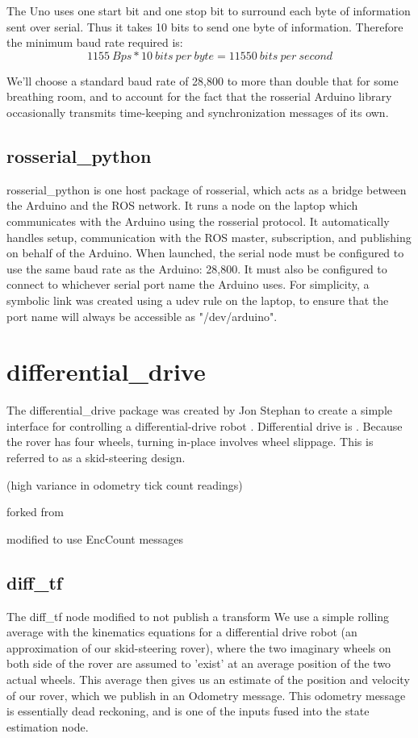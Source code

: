 The Uno uses one start bit and one stop bit to surround each byte of information sent over serial. Thus it takes 10 bits to send one byte of information. Therefore the minimum baud rate required is:
\[1155\ Bps * 10\ bits\ per\ byte = 11550\ bits\ per\ second\]

We'll choose a standard baud rate of 28,800 to more than double that for some breathing room, and to account for the fact that the rosserial Arduino library occasionally transmits time-keeping and synchronization messages of its own.

\subsection{rosserial\_python}
rosserial\_python is one host package of rosserial, which acts as a bridge between the Arduino and the ROS network. It runs a node on the laptop which communicates with the Arduino using the rosserial protocol. It automatically handles setup, communication with the ROS master, subscription, and publishing on behalf of the Arduino. When launched, the serial node must be configured to use the same baud rate as the Arduino: 28,800. It must also be configured to connect to whichever serial port name the Arduino uses. For simplicity, a symbolic link was created using a udev rule on the laptop, to ensure that the port name will always be accessible as "/dev/arduino". %

\section{differential\_drive}
The differential\_drive package was created by Jon Stephan to create a simple interface for controlling a differential-drive robot \cite{}. Differential drive is . Because the rover has four wheels, turning in-place involves wheel slippage. This is referred to as a skid-steering design. 

(high variance in odometry tick count readings)

forked from %

modified to use EncCount messages

\subsection{diff\_tf}
The diff\_tf node 
modified to not publish a transform
We use a simple
rolling average with the kinematics equations for a differential drive
robot (an approximation of our skid-steering rover), where the two imaginary
wheels on both side of the rover are assumed to 'exist' at an average position
of the two actual wheels. This average then gives us an estimate of the
position and velocity of our rover, which we publish in an Odometry message.
This odometry message is essentially dead reckoning, and is one of the inputs
fused into the state estimation node. 


